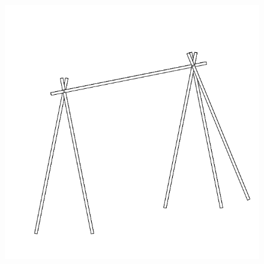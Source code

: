 \documentclass[17pt]{extreport}
\begin{document}
	\begin{figure}
		\centering
		\includegraphics[width=7.25in]{imageserver/uploadimages/image9.png}
	\end{figure}
\end{document}
